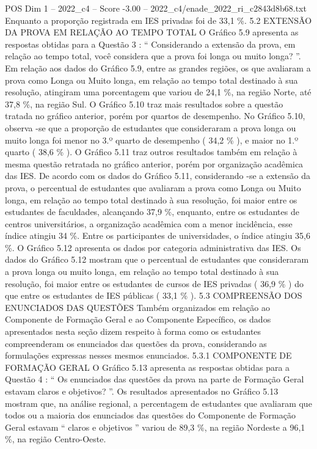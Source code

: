 \begin{textsample}{POS Dim 1 – 2022\_c4 – Score -3.00 – 2022\_c4/enade\_2022\_ri\_c2843d8b68.txt}
Enquanto a proporção registrada em IES privadas foi de 33,1 \%. 5.2 EXTENSÃO DA PROVA EM RELAÇÃO AO TEMPO TOTAL O Gráfico 5.9 apresenta as respostas obtidas para a Questão 3 : “ Considerando a extensão da prova, em relação ao tempo total, você considera que a prova foi longa ou muito longa? ”.
Em relação aos dados do Gráfico 5.9, entre as grandes regiões, os que avaliaram a prova como Longa ou Muito longa, em relação ao tempo total destinado à sua resolução, atingiram uma porcentagem que variou de 24,1 \%, na região Norte, até 37,8 \%, na região Sul.
O Gráfico 5.10 traz mais resultados sobre a questão tratada no gráfico anterior, porém por quartos de desempenho.
No Gráfico 5.10, observa -se que a proporção de estudantes que consideraram a prova longa ou muito longa foi menor no 3.º quarto de desempenho ( 34,2 \% ), e maior no 1.º quarto ( 38,6 \% ).
O Gráfico 5.11 traz outros resultados também em relação à mesma questão retratada no gráfico anterior, porém por organização acadêmica das IES.
De acordo com os dados do Gráfico 5.11, considerando -se a extensão da prova, o percentual de estudantes que avaliaram a prova como Longa ou Muito longa, em relação ao tempo total destinado à sua resolução, foi maior entre os estudantes de faculdades, alcançando 37,9 \%, enquanto, entre os estudantes de centros universitários, a organização acadêmica com a menor incidência, esse índice atingiu 34 \%.
Entre os participantes de universidades, o índice atingiu 35,6 \%.
O Gráfico 5.12 apresenta os dados por categoria administrativa das IES.
Os dados do Gráfico 5.12 mostram que o percentual de estudantes que consideraram a prova longa ou muito longa, em relação ao tempo total destinado à sua resolução, foi maior entre os estudantes de cursos de IES privadas ( 36,9 \% ) do que entre os estudantes de IES públicas ( 33,1 \% ). 5.3 COMPREENSÃO DOS ENUNCIADOS DAS QUESTÕES Também organizados em relação ao Componente de Formação Geral e ao Componente Específico, os dados apresentados nesta seção dizem respeito à forma como os estudantes compreenderam os enunciados das questões da prova, considerando as formulações expressas nesses mesmos enunciados. 5.3.1 COMPONENTE DE FORMAÇÃO GERAL O Gráfico 5.13 apresenta as respostas obtidas para a Questão 4 : “ Os enunciados das questões da prova na parte de Formação Geral estavam claros e objetivos? ”.
Os resultados apresentados no Gráfico 5.13 mostram que, na análise regional, a percentagem de estudantes que avaliaram que todos ou a maioria dos enunciados das questões do Componente de Formação Geral estavam “ claros e objetivos ” variou de 89,3 \%, na região Nordeste a 96,1 \%, na região Centro-Oeste.

\end{textsample}
